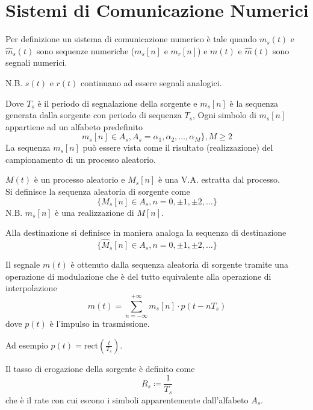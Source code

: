 \documentclass{article}
\begin{document}
\section*{Sistemi di Comunicazione Numerici}
Per definizione un sistema di comunicazione numerico è tale quando \( m_s(t) \) e \( \hat{m}_s(t)\) sono sequenze numeriche (\( m_s[n] \) e \( m_r[n] \)) e \( m(t) \) e \( \hat{m}(t) \) sono segnali numerici.

N.B. \( s(t) \) e \( r(t) \) continuano ad essere segnali analogici.

\begin{center}
\end{center}
Dove
\( T_s \) è il periodo di segnalazione della sorgente e
\( m_s[n] \) è la sequenza generata dalla sorgente con periodo di sequenza \( T_s \),
Ogni simbolo di \( m_s[n] \) appartiene ad un alfabeto predefinito
\[ m_s[n] \in A_s ,  A_s = \alpha_1, \alpha_2, \ldots, \alpha_M\} ,  M \geq 2  \]La sequenza \( m_s[n] \) può essere vista come il risultato (realizzazione) del campionamento di un processo aleatorio.



\( M(t) \) è un processo aleatorio e \( M_s[n] \) è una V.A. estratta dal processo. \\
Si definisce la sequenza aleatoria di sorgente come
\[ \{ M_s[n] \in A_s, n = 0, \pm 1, \pm 2, \ldots \} \]
N.B. \( m_s[n] \) è una realizzazione di \( M[n] \).

Alla destinazione si definisce in maniera analoga la sequenza di destinazione
\[ \{ \hat{M}_s[n] \in A_s, n = 0, \pm 1, \pm 2, \ldots \} \]

Il segnale \( m(t) \) è ottenuto dalla sequenza aleatoria di sorgente tramite una operazione di modulazione che è del tutto equivalente alla operazione di interpolazione
\[ m(t) = \sum_{n=-\infty}^{+\infty} m_s[n]\cdot p(t - nT_s) \]
dove \( p(t) \) è l'impulso in trasmissione.

Ad esempio \( p(t) = \text{rect}\left(\frac{t}{T_s}\right) \).

Il tasso di erogazione della sorgente è definito come
\[ R_s \coloneqq \frac{1}{T_s} \]
che è il rate con cui escono i simboli apparentemente dall'alfabeto \( A_s \).
\end{document}

